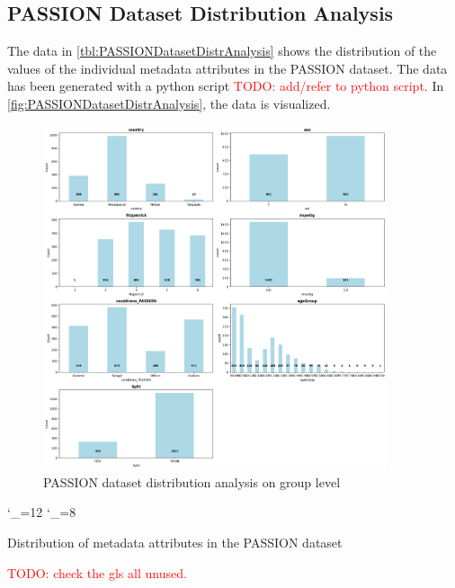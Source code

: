 \documentclass[12pt, a4paper, oneside]{book}   	%
\renewcommand{\todo}[1]{\textcolor{red}{TODO: #1}}
\begin{document}
\begin{appendices}
			\chapter{PASSION Dataset Distribution Analysis}\label{app:PASSIONdataDistributionAnalysis}

			The data in \autoref{tbl:PASSIONDatasetDistrAnalysis} shows the distribution of the values of the individual metadata attributes in the PASSION dataset. The data has been generated with a python script \todo{add/refer to python script}. In \autoref{fig:PASSIONDatasetDistrAnalysis}, the data is visualized.
			\begin{figure}[H]
				\centering
				\includegraphics[width=0.9\textwidth]{figures/PASSION_split_all_distributions.png}
				\caption{PASSION dataset distribution analysis on group level}
				\label{fig:PASSIONDatasetDistrAnalysis}
			\end{figure}
			
			\begin{table}[H]
				\centering
				{
					\catcode`\_=12
					\catcode`\_=8
				}
				\caption{Distribution of metadata attributes in the PASSION dataset}
				\label{tbl:PASSIONDatasetDistrAnalysis}
			\end{table}
		\end{appendices}
		
		
		
			
		\glsaddallunused                                %
		\todo{check the gls all unused.}
		
	
\end{document}

